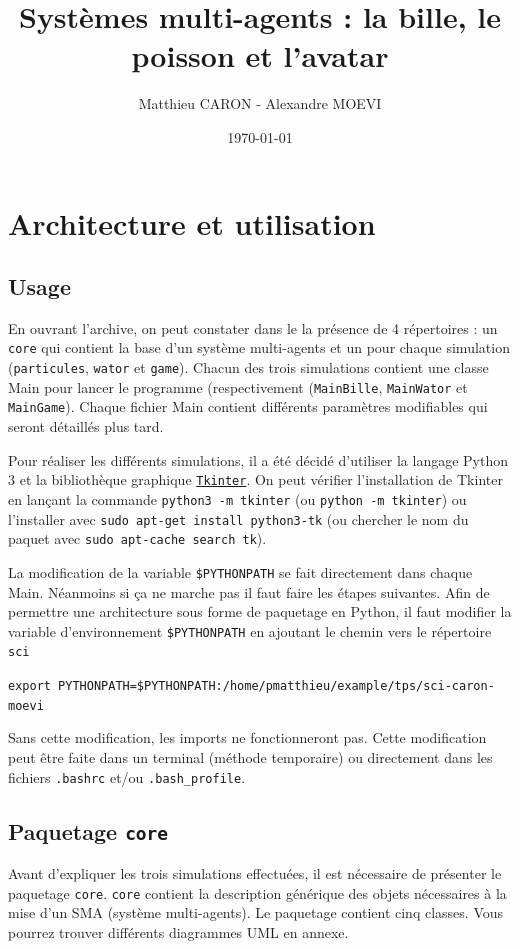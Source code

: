 \documentclass[a4paper]{article}
\title{Systèmes multi-agents : la bille, le poisson et l'avatar}
\author{Matthieu CARON - Alexandre MOEVI}
\date{\today}
\begin{document}
\maketitle

\section{Architecture et utilisation}

\subsection{Usage}

En ouvrant l'archive, on peut constater dans le la présence de 4 répertoires : un \texttt{core} qui contient la base d'un système multi-agents et un pour chaque simulation (\texttt{particules}, \texttt{wator} et \texttt{game}). Chacun des trois simulations contient une classe Main pour lancer le programme (respectivement (\texttt{MainBille}, \texttt{MainWator} et \texttt{MainGame}). Chaque fichier Main contient différents paramètres modifiables qui seront détaillés plus tard.

\medskip
Pour réaliser les différents simulations, il a été décidé d'utiliser la langage Python 3 et la bibliothèque graphique \href{https://wiki.python.org/moin/TkInter}{\texttt{Tkinter}}. On peut vérifier l'installation de Tkinter en lançant la commande \texttt{python3 -m tkinter} (ou \texttt{python -m tkinter}) ou l'installer avec \texttt{sudo apt-get install python3-tk} (ou chercher le nom du paquet avec \texttt{sudo apt-cache search tk}).

\medskip
La modification de la variable \texttt{\$PYTHONPATH} se fait directement dans chaque Main. Néanmoins si ça ne marche pas il faut faire les étapes suivantes.
Afin de permettre une architecture sous forme de paquetage en Python, il faut modifier la variable d'environnement \texttt{\$PYTHONPATH} en ajoutant le chemin vers le répertoire \texttt{sci} 

\medskip
\texttt{export PYTHONPATH=\$PYTHONPATH:/home/pmatthieu/example/tps/sci-caron-moevi}

\medskip
Sans cette modification, les imports ne fonctionneront pas. Cette modification peut être faite dans un terminal (méthode temporaire) ou directement dans les fichiers \texttt{.bashrc} et/ou \texttt{.bash\_profile}.
\newpage
\subsection{Paquetage \texttt{core}}
Avant d'expliquer les trois simulations effectuées, il est nécessaire de présenter le paquetage \texttt{core}. \texttt{core} contient la description générique des objets nécessaires à la mise d'un SMA (système multi-agents). Le paquetage contient cinq classes. Vous pourrez trouver différents diagrammes UML en annexe.
 
\end{document}
